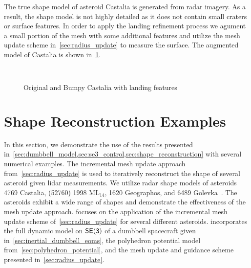 The true shape model of asteroid Castalia is generated from radar imagery.
As a result, the shape model is not highly detailed as it does not contain small craters or surface features.
In order to apply the landing refinement process we agument a small portion of the mesh with some additional features and utilize the mesh update scheme in~\cref{sec:radius_update} to measure the surface.
The augmented model of Castalia is shown in~\cref{fig:bumpy_castalia}.
\begin{figure}[htbp]
    \centering
    ~
    \caption{Original and Bumpy Castalia with landing features~\label{fig:bumpy_castalia}}
\end{figure}

\section{Shape Reconstruction Examples}
In this section, we demonstrate the use of the results presented in~\cref{sec:dumbbell_model,sec:se3_control,sec:shape_reconstruction} with several numerical examples.
The incremental mesh update approach from~\cref{sec:radius_update} is used to iteratively reconstruct the shape of several asteroid given \gls{lidar} measurements.
We utilize radar shape models of asteroids \num{4769} Castalia, (\num{52760}) \num{1998} \(\text{ML}_{14}\), \num{1620} Geographos, and 6489 Golevka~\cite{neese2004}.
The asteroids exhibit a wide range of shapes and demonstrate the effectiveness of the mesh update approach.
 focuses on the application of the incremental mesh update scheme of~\cref{sec:radius_update} for several different asteroids.
 incorporates the full dynamic model on \( \mathsf{SE(3)} \) of a dumbbell spacecraft given in~\cref{sec:inertial_dumbbell_eoms}, the polyhedron potential model from~\cref{sec:polyhedron_potential}, and the mesh update and guidance scheme presented in~\cref{sec:radius_update}.

